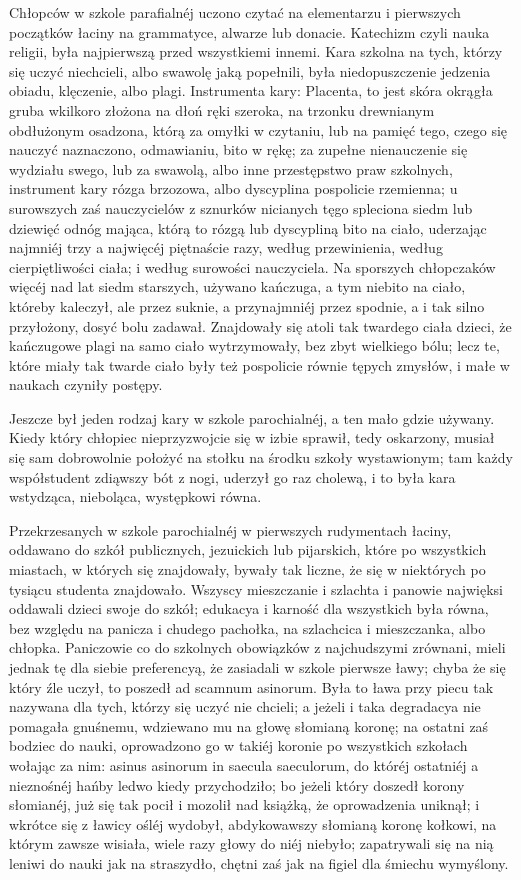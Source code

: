 \documentclass{book}
\begin{document}
Chłopców w szkole parafialnéj uczono czytać na elementarzu i pierwszych początków łaciny na grammatyce, alwarze lub donacie. Katechizm czyli nauka religii, była najpierwszą przed wszystkiemi innemi. Kara szkolna na tych, którzy się uczyć niechcieli, albo swawolę jaką popełnili, była niedopuszczenie jedzenia obiadu, klęczenie, albo plagi. Instrumenta kary: Placenta, to jest skóra okrągła gruba wkilkoro złożona na dłoń ręki szeroka, na trzonku drewnianym obdłużonym osadzona, którą za omyłki w czytaniu, lub na pamięć tego, czego się nauczyć naznaczono, odmawianiu, bito w rękę; za zupełne nienauczenie się wydziału swego, lub za swawolą, albo inne przestępstwo praw szkolnych, instrument kary rózga brzozowa, albo dyscyplina pospolicie rzemienna; u surowszych zaś nauczycielów z sznurków nicianych tęgo spleciona siedm lub dziewięć odnóg mająca, którą to rózgą lub dyscypliną bito na ciało, uderzając najmniéj trzy a najwięcéj piętnaście razy, według przewinienia, według cierpiętliwości ciała; i według surowości nauczyciela. Na sporszych chłopczaków więcéj nad lat siedm starszych, używano kańczuga, a tym niebito na ciało, któreby kaleczył, ale przez suknie, a przynajmniéj przez spodnie, a i tak silno przyłożony, dosyć bolu zadawał. Znajdowały się atoli tak twardego ciała dzieci, że kańczugowe plagi na samo ciało wytrzymowały, bez zbyt wielkiego bólu; lecz te, które miały tak twarde ciało były też pospolicie równie tępych zmysłów, i małe w naukach czyniły postępy.

Jeszcze był jeden rodzaj kary w szkole parochialnéj, a ten mało gdzie używany. Kiedy który chłopiec nieprzyzwojcie się w izbie sprawił, tedy oskarzony, musiał się sam dobrowolnie położyć na stołku na środku szkoły wystawionym; tam każdy współstudent zdiąwszy bót z nogi, uderzył go raz cholewą, i to była kara wstydząca, nieboląca, występkowi równa.

Przekrzesanych w szkole parochialnéj w pierwszych rudymentach łaciny, oddawano do szkół publicznych, jezuickich lub pijarskich, które po wszystkich miastach, w których się znajdowały, bywały tak liczne, że się w niektórych po tysiącu studenta znajdowało. Wszyscy mieszczanie i szlachta i panowie najwięksi oddawali dzieci swoje do szkół; edukacya i karność dla wszystkich była równa, bez względu na panicza i chudego pachołka, na szlachcica i mieszczanka, albo chłopka. Paniczowie co do szkolnych obowiązków z najchudszymi zrównani, mieli jednak tę dla siebie preferencyą, że zasiadali w szkole pierwsze ławy; chyba że się który źle uczył, to poszedł ad scamnum asinorum. Była to ława przy piecu tak nazywana dla tych, którzy się uczyć nie chcieli; a jeżeli i taka degradacya nie pomagała gnuśnemu, wdziewano mu na głowę słomianą koronę; na ostatni zaś bodziec do nauki, oprowadzono go w takiéj koronie po wszystkich szkołach wołając za nim: asinus asinorum in saecula saeculorum, do któréj ostatniéj a nieznośnéj hańby ledwo kiedy przychodziło; bo jeżeli który doszedł korony słomianéj, już się tak pocił i mozolił nad książką, że oprowadzenia uniknął; i wkrótce się z ławicy ośléj wydobył, abdykowawszy słomianą koronę kołkowi, na którym zawsze wisiała, wiele razy głowy do niéj niebyło; zapatrywali się na nią leniwi do nauki jak na straszydło, chętni zaś jak na figiel dla śmiechu wymyślony.
\end{document}
